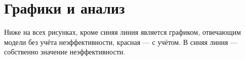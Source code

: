 \documentclass[10pt, a4paper]{article}
\begin{document}
\section{Графики и анализ}
Ниже на всех рисунках, кроме  синяя линия является графиком, отвечающим модели без учёта неэффективности, красная --- с учётом. В  синяя линия ---  собственно значение неэффективности.
\begin{figure}[H]
\centering
{}
\end{figure}
\end{document}
